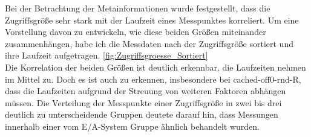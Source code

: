\documentclass[
	12pt,
	a4paper,
	BCOR10mm,
	DIV14,
	listof=totoc,
	bibliography=totoc,
	headsepline
]{scrreprt}
\begin{document}
Bei der Betrachtung der Metainformationen wurde festgestellt, dass die Zugriffsgröße sehr stark mit der Laufzeit eines Messpunktes korreliert. Um eine Vorstellung davon zu entwickeln, wie diese beiden Größen miteinander zusammenhängen, habe ich die Messdaten nach der Zugriffsgröße sortiert und ihre Laufzeit aufgetragen. \ref{fig:Zugriffsgroesse_Sortiert} \\
Die Korrelation der beiden Größen ist deutlich erkennbar, die Laufzeiten nehmen im Mittel zu. Doch es ist auch zu erkennen, insbesondere bei cached-off0-rnd-R, dass die Laufzeiten aufgrund der Streuung von weiteren Faktoren abhängen müssen. Die Verteilung der Messpunkte einer Zugriffsgröße in zwei bis drei deutlich zu unterscheidende Gruppen deutete darauf hin, dass Messungen innerhalb einer vom E/A-System Gruppe ähnlich behandelt wurden.
\end{document}
